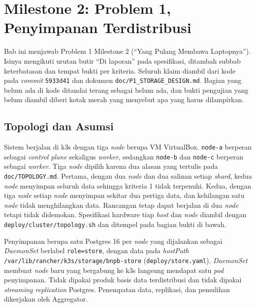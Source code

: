 \chapter[MILESTONE 2: PROBLEM 1]{Milestone 2: Problem 1, Penyimpanan Terdistribusi}

Bab ini menjawab Problem 1 Milestone 2 (``Yang Pulang Membawa Laptopnya''). Isinya mengikuti urutan butir ``Di laporan'' pada spesifikasi, ditambah subbab keterbatasan dan tempat bukti per kriteria. Seluruh klaim diambil dari kode pada \textit{commit} \texttt{5933d41} dan dokumen \texttt{doc/P1\_STORAGE\_DESIGN.md}. Bagian yang belum ada di kode ditandai terang sebagai belum ada, dan bukti pengujian yang belum diambil diberi kotak merah yang menyebut apa yang harus dilampirkan.

\section{Topologi dan Asumsi}

Sistem berjalan di k3s dengan tiga \textit{node} berupa VM VirtualBox. \texttt{node-a} berperan sebagai \textit{control plane} sekaligus \textit{worker}, sedangkan \texttt{node-b} dan \texttt{node-c} berperan sebagai \textit{worker}. Tiga \textit{node} dipilih karena dua alasan yang tertulis pada \texttt{doc/TOPOLOGY.md}. Pertama, dengan dua \textit{node} dan dua salinan setiap \textit{shard}, kedua \textit{node} menyimpan seluruh data sehingga kriteria 1 tidak terpenuhi. Kedua, dengan tiga \textit{node} setiap \textit{node} menyimpan sekitar dua pertiga data, dan kehilangan satu \textit{node} tidak menghilangkan data. Rancangan tetap dapat berjalan di dua \textit{node} tetapi tidak didemokan. Spesifikasi hardware tiap \textit{host} dan \textit{node} diambil dengan \texttt{deploy/cluster/topology.sh} dan ditempel pada bagian bukti di bawah.

Penyimpanan berupa satu Postgres 16 per \textit{node} yang dijalankan sebagai \textit{DaemonSet} berlabel \texttt{role=store}, dengan data pada \textit{hostPath} \texttt{/var/lib/rancher/k3s/storage/bnpb-store} (\texttt{deploy/store.yaml}). \textit{DaemonSet} membuat \textit{node} baru yang bergabung ke k3s langsung mendapat satu \textit{pod} penyimpanan. Tidak dipakai produk basis data terdistribusi dan tidak dipakai \textit{streaming replication} Postgres. Penempatan data, replikasi, dan pemulihan dikerjakan oleh Aggregator.

